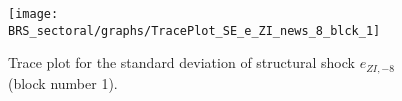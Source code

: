 \begin{figure}[H]
\centering
  \texttt{[image: BRS\_sectoral/graphs/TracePlot\_SE\_e\_ZI\_news\_8\_blck\_1]}\\
    \caption{Trace plot for the standard deviation of structural shock ${e_{ZI,-8}}$ (block number 1).}
\end{figure}

